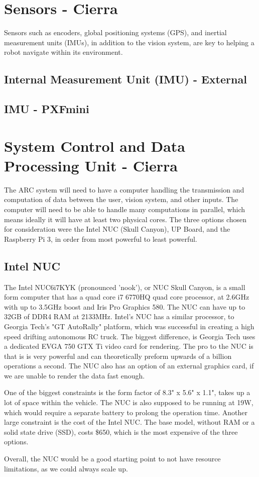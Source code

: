 \documentclass[compsoc,draftclsnofoot,onecolumn,10pt]{IEEEtran}
\begin{document}
\section{Sensors - Cierra}
Sensors such as encoders, global positioning systems (GPS), and inertial measurement units (IMUs), in addition to the vision system, are key to helping a robot navigate within its environment. 

\subsection{Internal Measurement Unit (IMU) - External}
\subsection{IMU - PXFmini}


\section{System Control and Data Processing Unit - Cierra}
The ARC system will need to have a computer handling the transmission and computation of data between the user, vision system, and other inputs. 
The computer will need to be able to handle many computations in parallel, which means ideally it will have at least two physical cores. 
The three options chosen for consideration were the Intel NUC (Skull Canyon), UP Board, and the Raspberry Pi 3, in order from most powerful to least powerful. 


\subsection{Intel NUC}
The Intel NUC6i7KYK (pronounced 'nook'), or NUC Skull Canyon, is a small form computer that has a quad core i7 6770HQ quad core processor, at 2.6GHz with up to 3.5GHz boost and Iris Pro Graphics 580. 
The NUC can have up to 32GB of DDR4 RAM at 2133MHz. 
Intel's NUC has a similar processor, to Georgia Tech's "GT AutoRally" platform, which was successful in creating a high speed drifting autonomous RC truck. 
The biggest difference, is Georgia Tech uses a dedicated EVGA 750 GTX Ti video card for rendering.
The pro to the NUC is that is is very powerful and can theoretically preform upwards of a billion operations a second. 
The NUC also has an option of an external graphics card, if we are unable to render the data fast enough. \par
One of the biggest constraints is the form factor of 8.3" x 5.6" x 1.1", takes up a lot of space within the vehicle.
The NUC is also supposed to be running at 19W, which would require a separate battery to prolong the operation time. 
Another large constraint is the cost of the Intel NUC. 
The base model, without RAM or a solid state drive (SSD), costs \$650, which is the most expensive of the three options. \par
Overall, the NUC would be a good starting point to not have resource limitations, as we could always scale up. 
\end{document}
